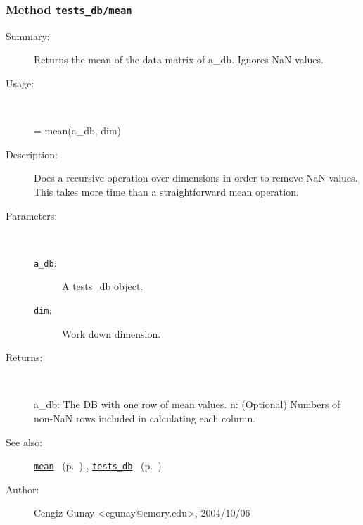 \subsubsection[Method \texttt{mean}]{Method \texttt{tests\_db/mean}}%
%
\label{ref_tests_db__mean}%
\hypertarget{ref_tests_db__mean}{}%
\begin{description}
\item[Summary:]Returns the mean of the data matrix of a\_db. Ignores NaN values.
%
\item[Usage:]~%
\begin{lyxcode}%
[a\_db, n] = mean(a\_db, dim)
%
\end{lyxcode}%
%
\item[Description:]%
Does a recursive operation over dimensions in order to remove NaN values.
 This takes more time than a straightforward mean operation. 
\item[Parameters:]~
\begin{description}%
\item[\texttt{a\_db}:]
 A tests\_db object.
\item[\texttt{dim}:]
 Work down dimension.
\end{description}%
%
\item[Returns:
]~

	a\_db: The DB with one row of mean values.
	n: (Optional) Numbers of non-NaN rows included in calculating each column.
%
%
\item[See also:]%
\hyperlink{ref_mean}{\texttt{mean}}%
\ (p.~\pageref{ref_mean})%
%
, \hyperlink{ref_tests_db}{\texttt{tests\_db}}%
\ (p.~\pageref{ref_tests_db})%
%
%
\item[Author:]%
Cengiz Gunay <cgunay@emory.edu>, 2004/10/06
%
\end{description}
\methodline%

